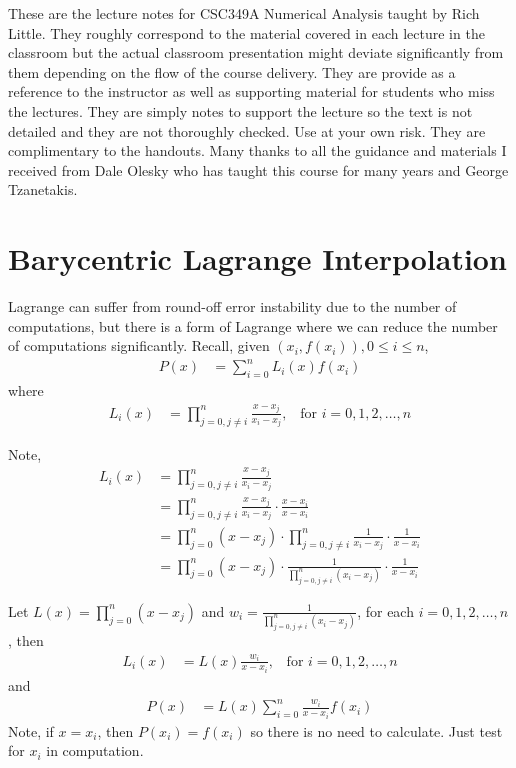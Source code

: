 \documentclass [titlepage,12pt,letter] {article}
\begin{document}
 


These are the lecture notes for CSC349A Numerical Analysis taught by
Rich Little. They roughly correspond to
the material covered in each lecture in the classroom but the actual
classroom presentation might deviate significantly from them depending
on the flow of the course delivery. They are provide as a reference to
the instructor as well as supporting material for students who miss
the lectures. They are simply notes to support the lecture so the text
is not detailed and they are not thoroughly checked. Use at your own
risk. They are complimentary to the handouts. Many thanks to all the
guidance and materials I received from Dale Olesky who has taught this
course for many years and George Tzanetakis.

\section{Barycentric Lagrange Interpolation}

Lagrange can suffer from round-off error instability due to the number of computations, but there is a form of Lagrange where we can reduce the number of computations significantly. Recall, given ${(x_i,f(x_i))}, 0 \leq i \leq n$, 
\begin{align*}
P(x) &= \sum_{i=0}^{n} L_i(x) f(x_i)
\end{align*}
where
\begin{align*}
L_i(x) &= \prod_{j=0,j \neq i}^{n} \frac{x-x_j}{x_i-x_j}, \;\;\; \mbox{for } i=0,1,2,\dots,n 
\end{align*}

Note,
\begin{align*}
L_i(x) &= \prod_{j=0,j \neq i}^{n} \frac{x-x_j}{x_i-x_j} \\
&= \prod_{j=0,j \neq i}^{n} \frac{x-x_j}{x_i-x_j} \cdot \frac{x-x_i}{x-x_i} \\
&= \prod_{j=0}^{n} (x-x_j) \cdot \prod_{j=0,j \neq i}^{n} \frac{1}{x_i-x_j} \cdot \frac{1}{x-x_i} \\
&= \prod_{j=0}^{n} (x-x_j) \cdot \frac{1}{\prod_{j=0,j \neq i}^{n}(x_i-x_j)} \cdot \frac{1}{x-x_i}
\end{align*}

Let $L(x)=\prod_{j=0}^{n} (x-x_j)$ and $w_i=\frac{1}{\prod_{j=0,j \neq i}^{n}(x_i-x_j)}$, for each $i=0,1,2,\dots,n$, then
\begin{align*}
L_i(x) &=L(x)\frac{w_i}{x-x_i}, \;\;\; \mbox{for } i=0,1,2,\dots,n
\end{align*}
and
\begin{align*}
P(x) &= L(x)\sum_{i=0}^{n} \frac{w_i}{x-x_i} f(x_i)
\end{align*}
Note, if $x=x_i$, then $P(x_i)=f(x_i)$ so there is no need to calculate. Just test for $x_i$ in computation.
\end{document}
